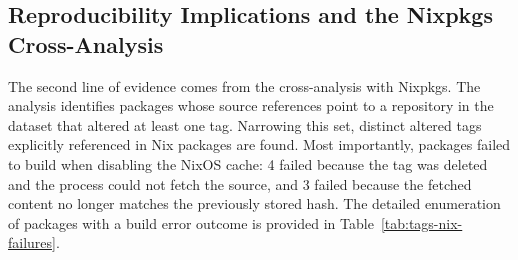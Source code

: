 \subsection{Reproducibility Implications and the Nixpkgs Cross-Analysis}
\label{subsec:tags-reproducibility}

The second line of evidence comes from the cross-analysis with Nixpkgs.
The analysis identifies \NixPkgsTracked packages whose source references point to a repository in the dataset that altered at least one tag.
Narrowing this set, \NixPkgsAffected distinct altered tags explicitly referenced in Nix packages are found.
Most importantly, \NixPkgsHashMismatch packages failed to build when disabling the NixOS cache: 4 failed because the tag was deleted and the process could not fetch the source, and 3 failed because the fetched content no longer matches the previously stored hash.
The detailed enumeration of packages with a build error outcome is provided in Table~\ref{tab:tags-nix-failures}.

\begin{table}[t]
\centering
\caption{Nix packages with build errors after tag alteration.}
\label{tab:tags-nix-failures}
\end{table}

